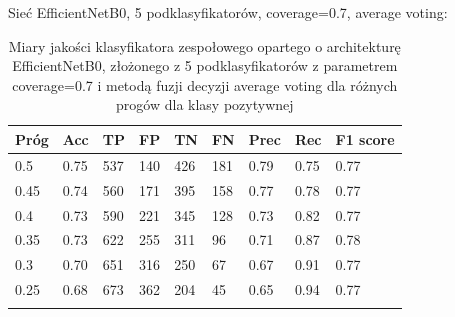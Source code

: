 \documentclass[polish,12pt]{aghthesis}
\begin{document}
\vspace{3.5mm}
\par\noindent Sieć EfficientNetB0, 5 podklasyfikatorów, coverage=0.7, average voting:
 \begin{longtable}[h!]{|m{2.0cm}|m{1.2cm}|m{1.2cm}|m{1.2cm}|m{1.2cm}|m{1.2cm}|m{1.2cm}|m{1.2cm}|m{1.6cm}|}
 \hline
 Próg & Acc & TP & FP & TN & FN & Prec & Rec & F1 score\\
 \hline
 0.5 & 0.75 & 537 & 140 & 426 & 181 & 0.79 & 0.75 & 0.77\\
 \hline
 0.45 & 0.74 & 560 & 171 & 395 & 158 & 0.77 & 0.78 & 0.77\\
 \hline
 0.4 & 0.73 & 590 & 221 & 345 & 128 & 0.73 & 0.82 & 0.77\\
 \hline
 0.35 & 0.73 & 622 & 255 & 311 & 96 & 0.71 & 0.87 & 0.78\\
 \hline
 0.3 & 0.70 & 651 & 316 & 250 & 67 & 0.67 & 0.91 & 0.77\\
 \hline
 0.25 & 0.68 & 673 & 362 & 204 & 45 & 0.65 & 0.94 & 0.77\\
 \hline
\caption{Miary jakości klasyfikatora zespołowego opartego o architekturę EfficientNetB0, złożonego z 5 podklasyfikatorów z parametrem coverage=0.7 i metodą fuzji decyzji average voting dla różnych progów dla klasy pozytywnej}
\label{table:40}
\end{longtable}
\end{document}
